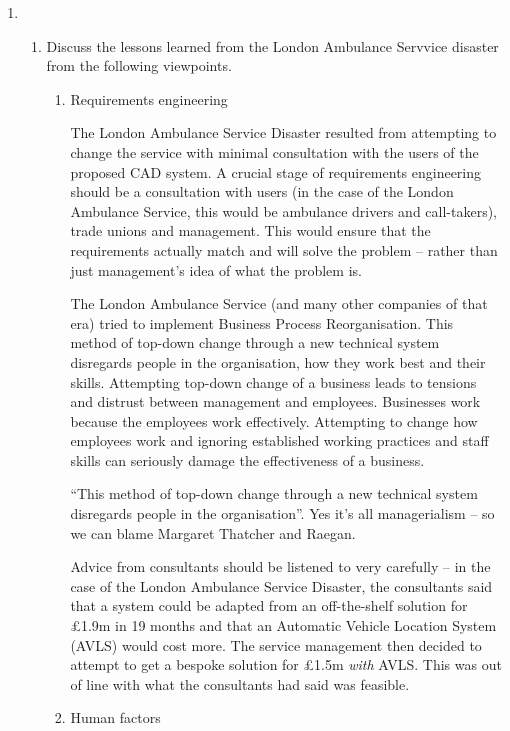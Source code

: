 \documentclass[10pt,\jkfside,a4paper]{article}
\begin{document}
\begin{enumerate}
\item 

\begin{enumerate}

\item Discuss the lessons learned from the London Ambulance Servvice disaster from the following viewpoints.

\begin{enumerate}[label=(\roman*)]

\item Requirements engineering

The London Ambulance Service Disaster resulted from attempting to change the service with 
minimal consultation with the users of the proposed CAD system. A crucial stage of requirements engineering should be 
a consultation with users (in the case of the London Ambulance Service, this would be ambulance drivers and 
call-takers), trade unions and management. This would ensure that the requirements actually match and will solve 
the problem -- rather than just management's idea of what the problem is. 

The London Ambulance Service (and many other companies of that era) tried to implement 
Business Process Reorganisation. This method of top-down change through a new technical system 
disregards people in the organisation, how they work best and their skills. Attempting top-down 
change of a business leads to tensions and distrust between management and employees. Businesses work 
because the employees work effectively. Attempting to change how employees work and ignoring 
established working practices and staff skills can seriously damage the effectiveness of a business.

{\color{blue} ``This method of top-down change through a new technical system
disregards people in the organisation''. Yes it's all managerialism -- so we can blame
Margaret Thatcher and Raegan.}

Advice from consultants should be listened to very carefully -- in the case of the 
London Ambulance Service Disaster, the consultants said that a system could be adapted from an off-the-shelf 
solution for \pounds1.9m in 19 months and that an Automatic Vehicle Location System (AVLS) would cost more. The service
management then decided to attempt to get a bespoke solution for \pounds1.5m \textit{with} AVLS.
This was out of line with what the consultants had said was feasible.

\item Human factors


\end{enumerate}
\end{enumerate}
\end{enumerate}
\end{document}
